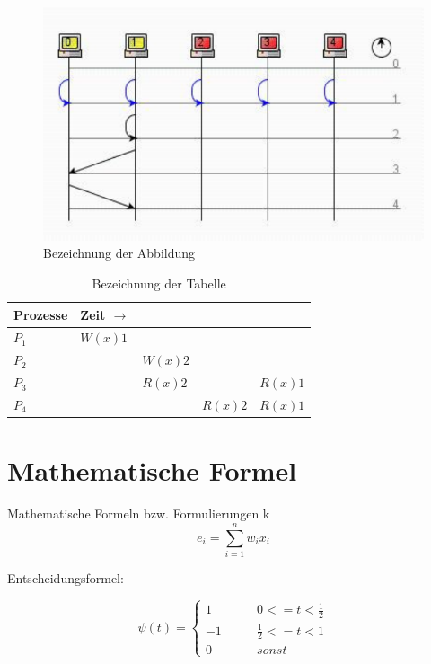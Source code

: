 \begin{figure} %
	\centering
		\includegraphics{images/p1ReadSeq.pdf}
	\caption{Bezeichnung der Abbildung}
	\label{a1}
\end{figure}

\begin{table} %
	\centering
		\begin{tabular}{l | l l l l}
		\textbf{Prozesse} & \textbf{Zeit} $\rightarrow$ \\
		\hline
			$P_{1}$ & $W(x)1$ \\
			$P_{2}$ & & $W(x)2$ \\
			$P_{3}$ & & $R(x)2$ & & $R(x)1$\\
			$P_{4}$ & & & $R(x)2$ & $R(x)1$\\
		\end{tabular}
	\caption{Bezeichnung der Tabelle}
	\label{t1}
\end{table}


\section{Mathematische Formel}
Mathematische Formeln bzw. Formulierungen k
\begin{equation}
\label{gl-1}
e_{i}=\sum _{i=1}^{n}w_{i}x_{i}
\end{equation}

Entscheidungsformel:

\begin{equation}
\psi(t)=\left\{\begin{array}{ccc}
1 &  \qquad 0 <= t < \frac{1}{2} \\
-1 &  \qquad \frac{1}{2} <= t <1 \\
0 & \qquad sonst
\end{array} \right.
\end{equation}


